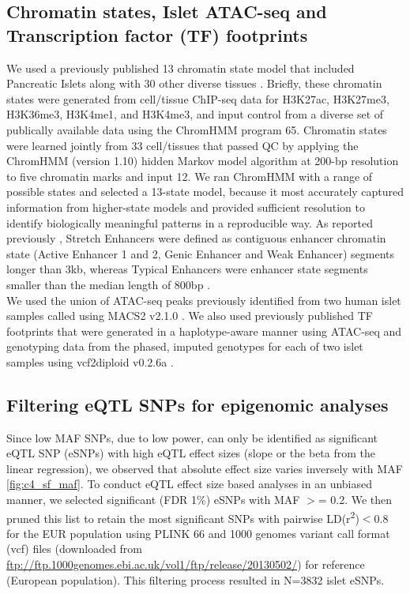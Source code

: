 \subsection{Chromatin states, Islet ATAC-seq and Transcription factor (TF) footprints}
We used a previously published 13 chromatin state model that included Pancreatic Islets along with 30 other diverse tissues \cite{varshneyGeneticRegulatorySignatures2017}. Briefly, these chromatin states were generated from cell/tissue ChIP-seq data for H3K27ac, H3K27me3, H3K36me3, H3K4me1, and H3K4me3, and input control from a diverse set of publically available data \cite{parkerChromatinStretchEnhancer2013, consortiumIntegrativeAnalysis1112015, ernstMappingAnalysisChromatin2011, mikkelsenComparativeEpigenomicAnalysis2010} using the ChromHMM program 65. Chromatin states were learned jointly from 33 cell/tissues that passed QC by applying the ChromHMM (version 1.10) hidden Markov model algorithm at 200-bp resolution to five chromatin marks and input 12. We ran ChromHMM with a range of possible states and selected a 13-state model, because it most accurately captured information from higher-state models and provided sufficient resolution to identify biologically meaningful patterns in a reproducible way. As reported previously \cite{varshneyGeneticRegulatorySignatures2017}, Stretch Enhancers were defined as contiguous enhancer chromatin state (Active Enhancer 1 and 2, Genic Enhancer and Weak Enhancer) segments longer than 3kb, whereas Typical Enhancers were enhancer state segments smaller than the median length of 800bp \cite{parkerChromatinStretchEnhancer2013}. \\

We used the union of ATAC-seq peaks previously identified from two human islet samples called using MACS2 v2.1.0 \cite{varshneyGeneticRegulatorySignatures2017}. We also used previously published TF footprints that were generated in a haplotype-aware manner using ATAC-seq and genotyping data from the phased, imputed genotypes for each of two islet samples using vcf2diploid v0.2.6a \cite{varshneyGeneticRegulatorySignatures2017}.

\subsection{Filtering eQTL SNPs for epigenomic analyses}
Since low MAF SNPs, due to low power, can only be identified as significant eQTL SNP (eSNPs) with high eQTL effect sizes (slope or the beta from the linear regression), we observed that absolute effect size varies inversely with MAF \ref{fig:c4_sf_maf}. To conduct eQTL effect size based analyses in an unbiased manner, we selected significant (FDR 1\%) eSNPs with MAF $>$= 0.2. We then pruned this list to retain the most significant SNPs with pairwise LD(r\textsuperscript{2})$<$0.8 for the EUR population using PLINK 66 and 1000 genomes variant call format (vcf) files (downloaded from \url{ftp://ftp.1000genomes.ebi.ac.uk/vol1/ftp/release/20130502/}) for reference (European population). This filtering process resulted in N=3832 islet eSNPs.


